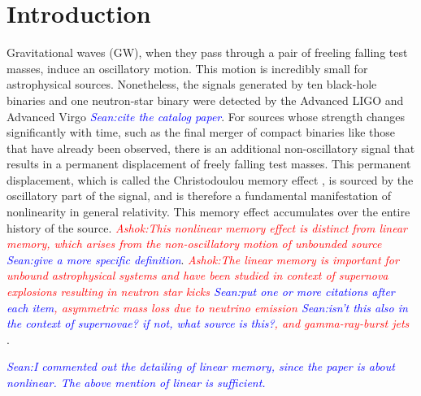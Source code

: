 \documentclass[twocolumn,showpacs,aps,prd,nobibnotes,floatfix]{revtex4-1}
\newcommand{\ashok}[1]{\textcolor{red}{\textit{Ashok:#1}}}
\newcommand{\stm}[1]{\textcolor{blue}{\textit{Sean:#1}}}
\begin{document}
\section{Introduction}

Gravitational waves (GW), when they pass through a pair of freeling falling test masses, induce an oscillatory motion. This motion is incredibly small for astrophysical sources. Nonetheless, the signals generated by ten black-hole binaries and one neutron-star binary were detected by the Advanced LIGO and Advanced Virgo\cite{Ligocatalog2018} \stm{cite the catalog paper}. For sources whose strength changes significantly with time, such as the final merger of compact binaries like those that have already been observed, there is an additional non-oscillatory signal that results in a permanent displacement of
freely falling test masses. This permanent displacement, which is called the Christodoulou memory effect \cite{Christodoulou1991}, is sourced by the oscillatory part of the signal, and is therefore a fundamental manifestation of nonlinearity in general relativity. This memory effect accumulates over the entire history of the source. \ashok{This nonlinear memory effect is distinct from linear memory, which arises from the non-oscillatory motion of unbounded source} \stm{give a more specific definition}. \ashok{The linear memory is important for unbound astrophysical systems and have been studied in context of supernova explosions resulting in neutron star kicks \cite{Burrows1996}\cite{Muller2004}\stm{put one or more citations after each item}, asymmetric mass loss due to neutrino emission \cite{COtt2009} \stm{isn't this also in the context of supernovae? if not, what source is this?}, and gamma-ray-burst jets \cite{Davies_Melvyn2002,Buonanno_Sigl2015,Kotake_Kei2009}}. 

\stm{I commented out the detailing of linear memory, since the paper is about nonlinear. The above mention of linear is sufficient.}
\end{document}
